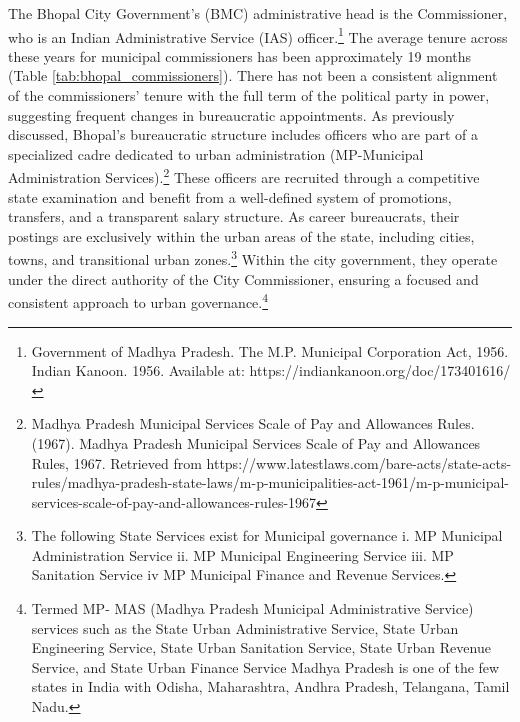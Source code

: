The Bhopal City Government's (BMC) administrative head is the Commissioner, who is an Indian Administrative Service (IAS) officer.\footnote{Government of Madhya Pradesh. The M.P. Municipal Corporation Act, 1956. Indian Kanoon. 1956. Available at: https://indiankanoon.org/doc/173401616/} The average tenure across these years for municipal commissioners has been approximately 19 months (Table \ref{tab:bhopal_commissioners}). There has not been a consistent alignment of the commissioners' tenure with the full term of the political party in power, suggesting frequent changes in bureaucratic appointments. As previously discussed, Bhopal's bureaucratic structure includes officers who are part of a specialized cadre dedicated to urban administration (MP-Municipal Administration Services).\footnote{Madhya Pradesh Municipal Services Scale of Pay and Allowances Rules. (1967). Madhya Pradesh Municipal Services Scale of Pay and Allowances Rules, 1967. Retrieved from https://www.latestlaws.com/bare-acts/state-acts-rules/madhya-pradesh-state-laws/m-p-municipalities-act-1961/m-p-municipal-services-scale-of-pay-and-allowances-rules-1967} These officers are recruited through a competitive state examination and benefit from a well-defined system of promotions, transfers, and a transparent salary structure. As career bureaucrats, their postings are exclusively within the urban areas of the state, including cities, towns, and transitional urban zones.\footnote{The following State Services exist for Municipal governance i. MP Municipal Administration Service ii. MP Municipal Engineering Service iii. MP Sanitation Service iv MP Municipal Finance and Revenue Services.} Within the city government, they operate under the direct authority of the City Commissioner, ensuring a focused and consistent approach to urban governance.\footnote{Termed MP- MAS (Madhya Pradesh Municipal Administrative Service) services such as the State Urban Administrative Service, State Urban Engineering Service, State Urban Sanitation Service, State Urban Revenue Service, and State Urban Finance Service Madhya Pradesh is one of the few states in India with Odisha, Maharashtra, Andhra Pradesh, Telangana, Tamil Nadu.}

